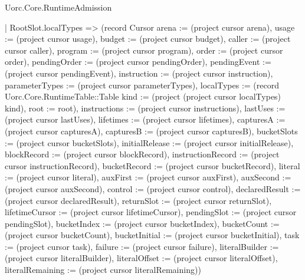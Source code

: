 \begin{lexlean}{Uorc.Core.RuntimeAdmission}
\begin{semanticmodule}
{    | RootSlot.localTypes => (record Cursor {arena := (project cursor arena), usage := (project cursor usage), budget := (project cursor budget), caller := (project cursor caller), program := (project cursor program), order := (project cursor order), pendingOrder := (project cursor pendingOrder), pendingEvent := (project cursor pendingEvent), instruction := (project cursor instruction), parameterTypes := (project cursor parameterTypes), localTypes := (record Uorc.Core.RuntimeTable::Table {kind := (project (project cursor localTypes) kind), root := root}), instructions := (project cursor instructions), lastUses := (project cursor lastUses), lifetimes := (project cursor lifetimes), capturesA := (project cursor capturesA), capturesB := (project cursor capturesB), bucketSlots := (project cursor bucketSlots), initialRelease := (project cursor initialRelease), blockRecord := (project cursor blockRecord), instructionRecord := (project cursor instructionRecord), bucketRecord := (project cursor bucketRecord), literal := (project cursor literal), auxFirst := (project cursor auxFirst), auxSecond := (project cursor auxSecond), control := (project cursor control), declaredResult := (project cursor declaredResult), returnSlot := (project cursor returnSlot), lifetimeCursor := (project cursor lifetimeCursor), pendingSlot := (project cursor pendingSlot), bucketIndex := (project cursor bucketIndex), bucketCount := (project cursor bucketCount), bucketInitial := (project cursor bucketInitial), task := (project cursor task), failure := (project cursor failure), literalBuilder := (project cursor literalBuilder), literalOffset := (project cursor literalOffset), literalRemaining := (project cursor literalRemaining)})
}
\end{semanticmodule}
\end{lexlean}
